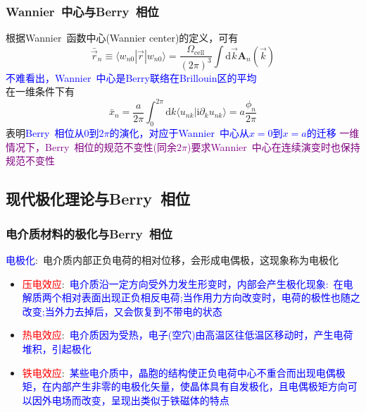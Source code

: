 \frame
{
	\frametitle{\textrm{Wannier~}中心与\textrm{Berry~}相位}
	根据\textrm{Wannier~}函数中心\textrm{(Wannier center)}的定义，可有
			\begin{displaymath}
				\bar{\vec r}_n\equiv\langle w_{n0}|\vec r|w_{n0}\rangle=\dfrac{\Omega_{\mathrm{cell}}}{(2\pi)^3}\int\mathrm{d}\vec k\mathbf{A}_n(\vec k)
			\end{displaymath}
			\textcolor{blue}{不难看出，\textrm{Wannier~}中心是\textrm{Berry}联络在\textrm{Brillouin}区的平均}\\
	在一维条件下有
	\begin{displaymath}
		\bar{x}_n=\dfrac{a}{2\pi}\int_0^{2\pi}\mathrm{d}k\langle u_{nk}|\mathrm{i}\partial_{k}u_{nk}\rangle=a\dfrac{\phi_n}{2\pi}
	\end{displaymath}
	表明\textcolor{blue}{\textrm{Berry~}相位从$0$到$2\pi$的演化，对应于\textrm{Wannier~}中心从$x=0$到$x=a$的迁移}
	\vskip 8pt
	\textcolor{purple}{一维情况下，\textrm{Berry~}相位的规范不变性(同余$2\pi$)要求\textrm{Wannier~}中心在连续演变时也保持规范不变性}
}

\subsection{现代极化理论与\rm{Berry~}相位}
\frame
{
	\frametitle{电介质材料的极化与\textrm{Berry~}相位}
	\textcolor{blue}{电极化}:~电介质内部正负电荷的相对位移，会形成电偶极，这现象称为电极化
	\begin{itemize}
\setlength{\itemsep}{10pt}
		\item \textcolor{red}{压电效应}:~\textcolor{blue}{电介质沿一定方向受外力发生形变时，内部会产生极化现象:~在电解质两个相对表面出现正负相反电荷;当作用力方向改变时，电荷的极性也随之改变;当外力去掉后，又会恢复到不带电的状态}
		\item \textcolor{red}{热电效应}:~\textcolor{blue}{电介质因为受热，电子(空穴)由高温区往低温区移动时，产生电荷堆积，引起极化}
		\item \textcolor{red}{铁电效应}:~\textcolor{blue}{某些电介质中，晶胞的结构使正负电荷中心不重合而出现电偶极矩，在内部产生非零的电极化矢量，使晶体具有自发极化，且电偶极矩方向可以因外电场而改变，呈现出类似于铁磁体的特点}
	\end{itemize}
}

